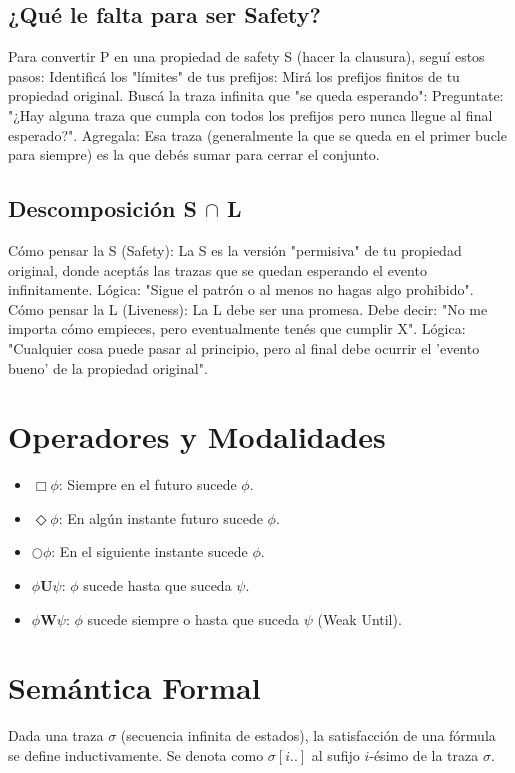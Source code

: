 \documentclass[11pt,a4paper]{article}
\begin{document}
\subsection{¿Qué le falta para ser Safety?}
Para convertir P en una propiedad de safety S (hacer la clausura), seguí estos pasos: 
Identificá los "límites" de tus prefijos: Mirá los prefijos finitos de tu propiedad original.
Buscá la traza infinita que "se queda esperando": Preguntate: "¿Hay alguna traza que cumpla con todos los prefijos pero nunca llegue al final esperado?".
Agregala: Esa traza (generalmente la que se queda en el primer bucle para siempre) es la que debés sumar para cerrar el conjunto.

\subsection{Descomposición S $\cap$ L}
Cómo pensar la S (Safety): La S es la versión "permisiva" de tu propiedad original, donde aceptás las trazas que se quedan esperando el evento infinitamente.
Lógica: "Sigue el patrón o al menos no hagas algo prohibido".
Cómo pensar la L (Liveness): La L debe ser una promesa. Debe decir: "No me importa cómo empieces, pero eventualmente tenés que cumplir X".
Lógica: "Cualquier cosa puede pasar al principio, pero al final debe ocurrir el 'evento bueno' de la propiedad original".

\section{Operadores y Modalidades}

\begin{itemize}
    \item $\Box \phi$: Siempre en el futuro sucede $\phi$.
    \item $\Diamond \phi$: En algún instante futuro sucede $\phi$.
    \item $\bigcirc \phi$: En el siguiente instante sucede $\phi$.
    \item $\phi \mathbf{U} \psi$: $\phi$ sucede hasta que suceda $\psi$.
    \item $\phi \mathbf{W} \psi$: $\phi$ sucede siempre o hasta que suceda $\psi$ (Weak Until).
\end{itemize}

\section{Semántica Formal}
Dada una traza $\sigma$ (secuencia infinita de estados), la satisfacción de una fórmula se define inductivamente. Se denota como $\sigma[i..]$ al sufijo $i$-ésimo de la traza $\sigma$.
\end{document}
